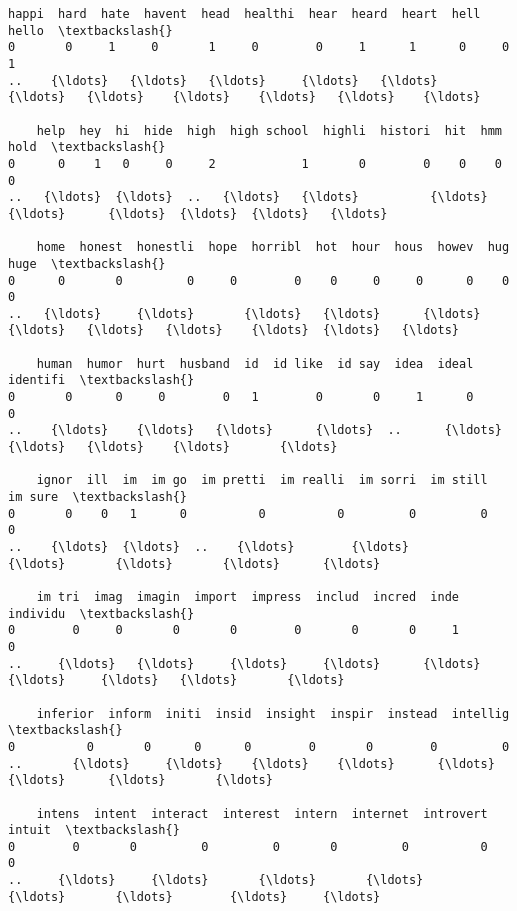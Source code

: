 \documentclass[11pt]{article}
\begin{document}
\begin{Verbatim}[commandchars=\\\{\}]
    happi  hard  hate  havent  head  healthi  hear  heard  heart  hell  hello  \textbackslash{}
0       0     1     0       1     0        0     1      1      0     0      1   
..    {\ldots}   {\ldots}   {\ldots}     {\ldots}   {\ldots}      {\ldots}   {\ldots}    {\ldots}    {\ldots}   {\ldots}    {\ldots}   

    help  hey  hi  hide  high  high school  highli  histori  hit  hmm  hold  \textbackslash{}
0      0    1   0     0     2            1       0        0    0    0     0   
..   {\ldots}  {\ldots}  ..   {\ldots}   {\ldots}          {\ldots}     {\ldots}      {\ldots}  {\ldots}  {\ldots}   {\ldots}   

    home  honest  honestli  hope  horribl  hot  hour  hous  howev  hug  huge  \textbackslash{}
0      0       0         0     0        0    0     0     0      0    0     0   
..   {\ldots}     {\ldots}       {\ldots}   {\ldots}      {\ldots}  {\ldots}   {\ldots}   {\ldots}    {\ldots}  {\ldots}   {\ldots}   

    human  humor  hurt  husband  id  id like  id say  idea  ideal  identifi  \textbackslash{}
0       0      0     0        0   1        0       0     1      0         0   
..    {\ldots}    {\ldots}   {\ldots}      {\ldots}  ..      {\ldots}     {\ldots}   {\ldots}    {\ldots}       {\ldots}   

    ignor  ill  im  im go  im pretti  im realli  im sorri  im still  im sure  \textbackslash{}
0       0    0   1      0          0          0         0         0        0   
..    {\ldots}  {\ldots}  ..    {\ldots}        {\ldots}        {\ldots}       {\ldots}       {\ldots}      {\ldots}   

    im tri  imag  imagin  import  impress  includ  incred  inde  individu  \textbackslash{}
0        0     0       0       0        0       0       0     1         0   
..     {\ldots}   {\ldots}     {\ldots}     {\ldots}      {\ldots}     {\ldots}     {\ldots}   {\ldots}       {\ldots}   

    inferior  inform  initi  insid  insight  inspir  instead  intellig  \textbackslash{}
0          0       0      0      0        0       0        0         0   
..       {\ldots}     {\ldots}    {\ldots}    {\ldots}      {\ldots}     {\ldots}      {\ldots}       {\ldots}   

    intens  intent  interact  interest  intern  internet  introvert  intuit  \textbackslash{}
0        0       0         0         0       0         0          0       0   
..     {\ldots}     {\ldots}       {\ldots}       {\ldots}     {\ldots}       {\ldots}        {\ldots}     {\ldots}   


\end{Verbatim}
\end{document}

